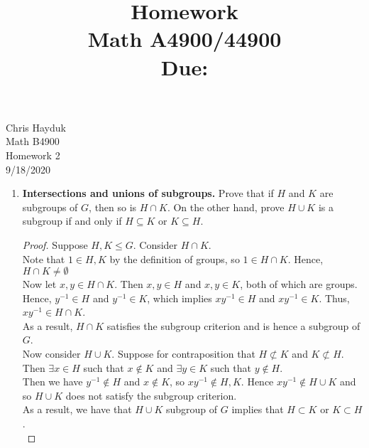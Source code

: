 \documentclass[11pt, reqno]{amsart}
\title[Homework \HW]{Homework \HW \\
Math A4900/44900\\
\small Due: \DUE}
\author{}
\theoremstyle{plain}
\theoremstyle{definition}
\theoremstyle{example}
\def\HW{2}
\def\DUE{9/18/2020}
\begin{document}
\begin{flushright}
Chris Hayduk\\
Math B4900\\
Homework \HW\\
\DUE
\end{flushright}





\begin{enumerate}[1.]
\item \textbf{Intersections and unions of subgroups.} Prove that if $H$ and $K$ are subgroups of $G$, then so is $H \cap K$. 
On the other hand, prove $H \cup K$ is a subgroup if and only if $H \subseteq K$ or $K \subseteq H$.

\begin{proof}
Suppose $H, K \leqslant G$. Consider $H \cap K$.\\

Note that $1 \in H, K$ by the definition of groups, so $1 \in H \cap K$. Hence, $H \cap K \neq \emptyset$\\

Now let $x, y \in H \cap K$. Then $x, y \in H$ and $x, y \in K$, both of which are groups. Hence, $y^{-1} \in H$ and $y^{-1} \in K$, which implies $xy^{-1} \in H$ and $xy^{-1} \in K$. Thus, $xy^{-1} \in H \cap K$.\\

As a result, $H \cap K$ satisfies the subgroup criterion and is hence a subgroup of $G$.\\

Now consider $H \cup K$. Suppose for contraposition that $H \not\subset K$ and $K \not\subset H$. Then $\exists x \in H$ such that $x \not\in K$ and $\exists y \in K$ such that $y \not\in H$.\\

Then we have $y^{-1} \not\in H$ and $x \not\in K$, so $xy^{-1} \not\in H, K$. Hence $xy^{-1} \not\in H \cup K$ and so $H \cup K$ does not satisfy the subgroup criterion.\\

As a result, we have that $H \cup K$ subgroup of $G$ implies that $H \subset K$ or $K \subset H$.\\


\end{proof}
\end{enumerate}
\end{document}
